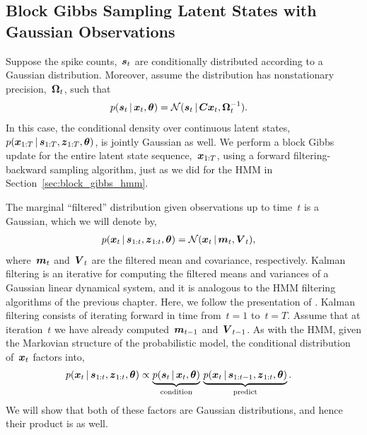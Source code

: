 \subsection{Block Gibbs Sampling Latent States with Gaussian Observations}
Suppose the spike counts,~$\boldsymbol{s}_t$ are conditionally distributed
according to a Gaussian distribution. Moreover, assume the
distribution has nonstationary precision,~$\boldsymbol{\Omega}_t$, such that
\begin{align}
  \label{eq:gauss_lkhd}
  p(\boldsymbol{s}_t \,|\, \boldsymbol{x}_t, \boldsymbol{\theta}) 
  &=
  \mathcal{N}(\boldsymbol{s}_t \,|\, \boldsymbol{C} \boldsymbol{x}_t, \boldsymbol{\Omega}_t^{-1}).
\end{align}
In this case, the conditional density over continuous latent
states,~${p(\boldsymbol{x}_{1:T} \,|\, \boldsymbol{s}_{1:T}, \boldsymbol{z}_{1:T}, \boldsymbol{\theta})}$, is
jointly Gaussian as well. We perform a block Gibbs update for the
entire latent state sequence,~$\boldsymbol{x}_{1:T}$, using a
forward filtering-backward sampling algorithm, just as we did for the
HMM in Section~\ref{sec:block_gibbs_hmm}.

The marginal ``filtered'' distribution
given observations up to time~$t$ is a Gaussian, which we will denote
by,
\begin{align*}
  p(\boldsymbol{x}_t \,|\, \boldsymbol{s}_{1:t}, \boldsymbol{z}_{1:t}, \boldsymbol{\theta}) &= \mathcal{N}(\boldsymbol{x}_t \,|\, \boldsymbol{m}_t, \boldsymbol{V}_t),
\end{align*}
where~$\boldsymbol{m}_t$ and~$\boldsymbol{V}_t$ are the filtered mean and covariance, respectively.
Kalman filtering is an iterative for computing the filtered
means and variances of a Gaussian linear dynamical system, and it
is analogous to the HMM filtering algorithms of the previous chapter.
Here, we
follow the presentation of \citet[Chapter
  18]{murphy2012probabilistic}.  Kalman filtering consists of
iterating forward in time from~${t=1}$ to~${t=T}$. Assume that at
iteration~$t$ we have already computed~$\boldsymbol{m}_{t-1}$
and~$\boldsymbol{V}_{t-1}$. As with the HMM, given the Markovian structure of the
probabilistic model, the conditional distribution of~$\boldsymbol{x}_t$ factors
into,
\begin{align*}
  p(\boldsymbol{x}_t \,|\, \boldsymbol{s}_{1:t}, \boldsymbol{z}_{1:t}, \boldsymbol{\theta})
  &\propto
  \underbrace{p(\boldsymbol{s}_t \,|\, \boldsymbol{x}_t, \boldsymbol{\theta})}_{\text{condition}} \,
  \underbrace{p(\boldsymbol{x}_{t} \,|\, \boldsymbol{s}_{1:t-1}, \boldsymbol{z}_{1:t}, \boldsymbol{\theta})}_{\text{predict}}.
\end{align*}
We will show that both of these factors are Gaussian distributions, 
and hence their product is as well. 


